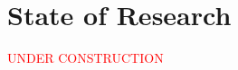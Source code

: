 \documentclass[../paper.tex]{subfiles}
\begin{document}
\section{State of Research}
\textcolor{red}{UNDER CONSTRUCTION} 
\end{document}
